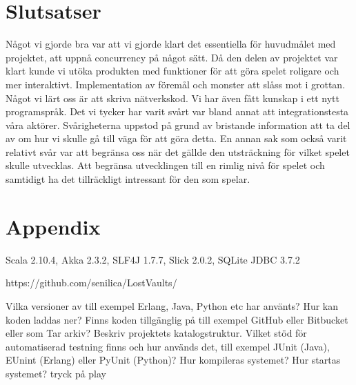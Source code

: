 \documentclass[a4paper]{article}
\begin{document}
\section{Slutsatser}
Något vi gjorde bra var att vi gjorde klart det essentiella för huvudmålet med projektet, att uppnå concurrency på något sätt. 
Då den delen av projektet var klart kunde vi utöka produkten med funktioner för att göra spelet roligare och mer interaktivt. 
Implementation av föremål och monster att slåss mot i grottan. 
Något vi lärt oss är att skriva nätverkskod. Vi har även fått kunskap i ett nytt programspråk.
Det vi tycker har varit svårt var bland annat att integrationstesta våra aktörer. Svårigheterna uppstod på grund av bristande 
information att ta del av om hur vi skulle gå till väga för att göra detta. En annan sak som också varit relativt svår var att 
begränsa oss när det gällde den utsträckning för vilket spelet skulle utvecklas. Att begränsa utvecklingen till en rimlig nivå för spelet 
och samtidigt ha det tillräckligt intressant för den som spelar.

\section{Appendix}

Scala 2.10.4, Akka 2.3.2, SLF4J 1.7.7, Slick 2.0.2, SQLite JDBC 3.7.2

https://github.com/senilica/LostVaults/

Vilka versioner av till exempel Erlang, Java, Python etc har använts?
Hur kan koden laddas ner? Finns koden tillgänglig på till exempel GitHub eller Bitbucket eller som Tar arkiv?  Beskriv projektets katalogstruktur.
Vilket stöd för automatiserad testning finns och hur används det, till exempel JUnit (Java), EUnint (Erlang) eller PyUnit (Python)?
Hur kompileras systemet?
Hur startas systemet? tryck på play
\end{document}
